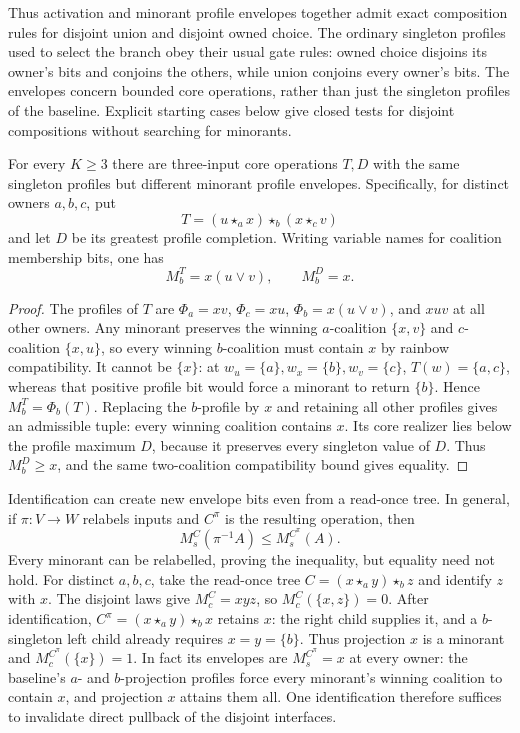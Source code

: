 Thus activation and minorant profile envelopes together admit exact
composition rules for disjoint union and disjoint owned choice.
The ordinary singleton profiles used to select the branch obey their
usual gate rules: owned choice disjoins its owner's bits and conjoins
the others, while union conjoins every owner's bits.
The envelopes concern bounded core operations, rather than just the
singleton profiles of the baseline. Explicit starting cases below give
closed tests for disjoint compositions without searching for minorants.

\begin{proposition}
\label{core:prop:minorant-profile-data}
For every $K\geq3$ there are three-input core operations $T,D$ with
the same singleton profiles but different minorant profile envelopes.
Specifically, for distinct owners $a,b,c$, put
\[
 T=(u\star_a x)\star_b(x\star_c v)
\]
and let $D$ be its greatest profile completion. Writing variable names
for coalition membership bits, one has
\[
 M_b^T=x(u\lor v),\qquad M_b^D=x.
\]
\end{proposition}
\begin{proof}
The profiles of $T$ are
$\Phi_a=xv$, $\Phi_c=xu$, $\Phi_b=x(u\lor v)$, and $xuv$ at all
other owners. Any minorant preserves the winning $a$-coalition
$\{x,v\}$ and $c$-coalition $\{x,u\}$, so every winning
$b$-coalition must contain $x$ by rainbow compatibility.
It cannot be $\{x\}$: at $w_u=\{a\},w_x=\{b\},w_v=\{c\}$,
$T(w)=\{a,c\}$, whereas that positive profile bit would force a
minorant to return $\{b\}$. Hence $M_b^T=\Phi_b(T)$.
Replacing the $b$-profile by $x$ and retaining all other profiles
gives an admissible tuple: every winning coalition contains $x$.
Its core realizer lies below the profile maximum $D$, because it
preserves every singleton value of $D$. Thus $M_b^D\geq x$, and
the same two-coalition compatibility bound gives equality.
\end{proof}

Identification can create new envelope bits even from a read-once tree.
In general, if $\pi:V\to W$ relabels inputs and $C^\pi$ is the resulting
operation, then
\[
 M_s^C(\pi^{-1}A)\leq M_s^{C^\pi}(A).
\]
Every minorant can be relabelled, proving the inequality, but equality
need not hold. For distinct $a,b,c$, take the read-once tree
$C=(x\star_a y)\star_b z$ and identify $z$ with $x$.
The disjoint laws give $M_c^C=xyz$, so
$M_c^C(\{x,z\})=0$.
After identification, $C^\pi=(x\star_a y)\star_b x$ retains $x$:
the right child supplies it, and a $b$-singleton left child already
requires $x=y=\{b\}$. Thus projection $x$ is a minorant and
$M_c^{C^\pi}(\{x\})=1$.
In fact its envelopes are $M_s^{C^\pi}=x$ at every owner: the
baseline's $a$- and $b$-projection profiles force every minorant's
winning coalition to contain $x$, and projection $x$ attains them all.
One identification therefore suffices to invalidate direct pullback of
the disjoint interfaces.

